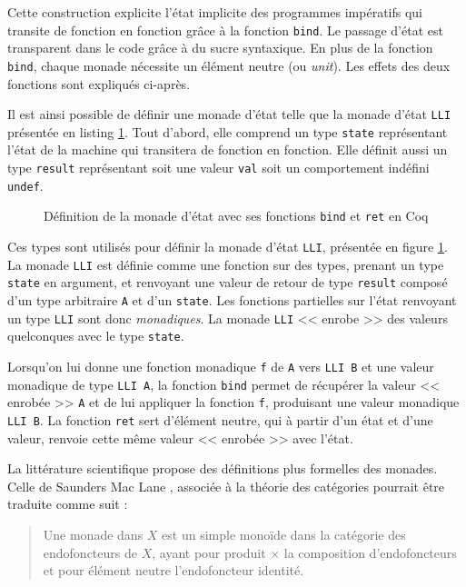 				Cette construction explicite l'état implicite des programmes impératifs qui transite de fonction en fonction grâce à la fonction \texttt{bind}. Le passage d'état est transparent dans le code grâce à du sucre syntaxique. En plus de la fonction \texttt{bind}, chaque monade nécessite un élément neutre (ou \emph{unit}). Les effets des deux fonctions sont expliqués ci-après.

				Il est ainsi possible de définir une monade d'état telle que la monade d'état \texttt{LLI} présentée en listing \ref{code:monad}. Tout d'abord, elle comprend un type \texttt{state} représentant l'état de la machine qui transitera de fonction en fonction. Elle définit aussi un type \texttt{result} représentant soit une valeur \texttt{val} soit un comportement indéfini \texttt{undef}.

\begin{figure}[!h]
	\caption{Définition de la monade d'état avec ses fonctions \texttt{bind} et \texttt{ret} en Coq}
	\label{code:monad}
\end{figure}

Ces types sont utilisés pour définir la monade d'état \texttt{LLI}, présentée en figure \ref{code:monad}. La monade \texttt{LLI} est définie comme une fonction sur des types, prenant un type \texttt{state} en argument, et renvoyant une valeur de retour de type \texttt{result} composé d'un type arbitraire \texttt{A} et d'un \texttt{state}. Les fonctions partielles sur l'état renvoyant un type \texttt{LLI} sont donc \emph{monadiques}. La monade \texttt{LLI} << enrobe >> des valeurs quelconques avec le type \texttt{state}.

Lorsqu'on lui donne une fonction monadique \texttt{f} de \texttt{A} vers \texttt{LLI B} et une valeur monadique de type \texttt{LLI A}, la fonction \texttt{bind} permet de récupérer la valeur << enrobée >> \texttt{A} et de lui appliquer la fonction \texttt{f}, produisant une valeur monadique \texttt{LLI B}. La fonction \texttt{ret} sert d'élément neutre, qui à partir d'un état et d'une valeur, renvoie cette même valeur << enrobée >> avec l'état.

La littérature scientifique propose des définitions plus formelles des monades. Celle de Saunders Mac Lane \cite[134]{mac2013categories}, associée à la théorie des catégories pourrait être traduite comme suit :

\blockquote{Une monade dans $X$ est un simple monoïde dans la catégorie des endofoncteurs de $X$, ayant pour produit $\times$ la composition d'endofoncteurs et pour élément neutre l'endofoncteur identité.}

